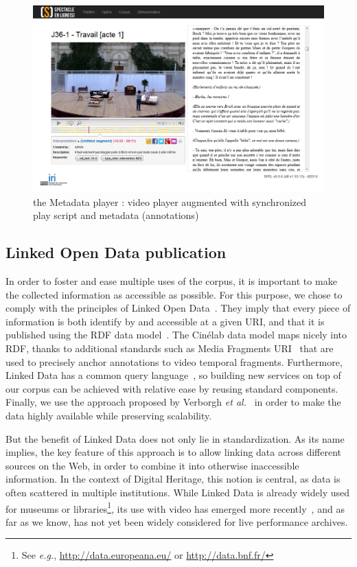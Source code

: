 \documentclass[conference]{IEEEtran}
\begin{document}
\begin{figure}[htb!]
  \centering
  \includegraphics[width=\columnwidth]{mdplayer}
  \caption{the Metadata player : video player augmented with synchronized play script and metadata (annotations)}
  \label{fig:mdplayer}
\end{figure}

\subsection{Linked Open Data publication}
In order to foster and ease multiple uses of the corpus,
it is important to make the collected information as accessible as possible.
For this purpose, we chose to comply with the principles of Linked Open Data~\cite{bernerslee2006linkeddata}.
They imply that every piece of information is both identify by and accessible at a given URI, and that it is published using the RDF data model~\cite{cyganiak2014rdf11concepts}.
The Cinélab data model maps nicely into RDF, thanks to additional standards such as Media Fragments URI~\cite{troncy2012mediafragments} that are used to precisely anchor annotations to video temporal fragments. Furthermore, Linked Data has a common query language~\cite{prudhommeaux2008sparql}, so building new services on top of our corpus can be achieved with relative ease by reusing standard components. Finally, we use the approach proposed by Verborgh \emph{et al.}~\cite{verborgh2014querying} in order to make the data highly available while preserving scalability.

But the benefit of Linked Data does not only lie in standardization.
As its name implies, the key feature of this approach is to allow linking data across different sources on the Web, in order to combine it into otherwise inaccessible information.
In the context of Digital Heritage, this notion is central, as data is often scattered in multiple institutions.
While Linked Data is already widely used for museums or libraries\footnote{
See \emph{e.g.}, \url{http://data.europeana.eu/} or \url{http://data.bnf.fr/}},
its use with video has emerged more recently~\cite{vandeursen2012mediafragmentannotations,steiner2014webvtt},
and as far as we know, has not yet been widely considered for live performance archives.
\end{document}
